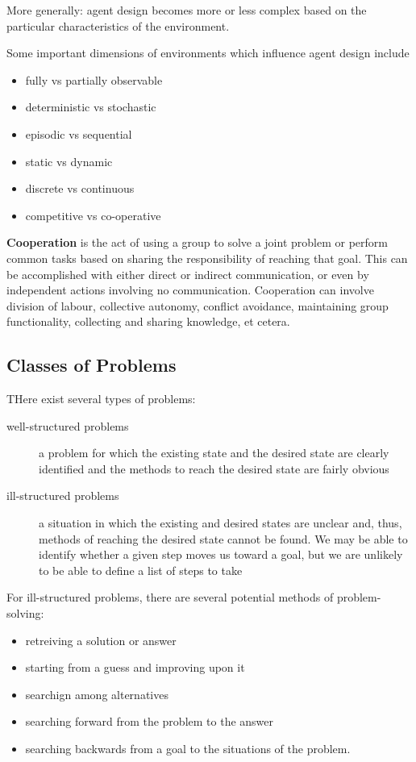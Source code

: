 \documentclass[12pt]{article}
\begin{document}
More generally: agent design becomes more or less complex based on the particular characteristics of the environment.

Some important dimensions of environments which influence agent design include
\begin{itemize}
\item fully vs partially observable
\item deterministic vs stochastic
\item episodic vs sequential
\item static vs dynamic
\item discrete vs continuous
\item competitive vs co-operative
\end{itemize}

{\bf Cooperation} is the act of using a group to solve a joint problem or perform common tasks based on sharing the responsibility of reaching that goal. This can be accomplished with either direct or indirect communication, or even by independent actions involving no communication. Cooperation can involve division of labour, collective autonomy, conflict avoidance, maintaining group functionality, collecting and sharing knowledge, et cetera.

\subsection{Classes of Problems}
THere exist several types of problems:
\begin{description}
\item[well-structured problems] a problem for which the existing state and the desired state are clearly identified and the methods to reach the desired state are fairly obvious
\item[ill-structured problems] a situation in which the existing and desired states are unclear and, thus, methods of reaching the desired state cannot be found. We may be able to identify whether a given step moves us toward a goal, but we are unlikely to be able to define a list of steps to take
\end{description}

For ill-structured problems, there are several potential methods of problem-solving:
\begin{itemize}
\item retreiving a solution or answer
\item starting from a guess and improving upon it
\item searchign among alternatives
\item searching forward from the problem to the answer
\item searching backwards from a goal to the situations of the problem.
\end{itemize}
\end{document}
